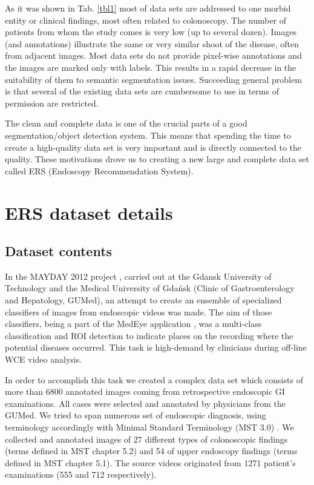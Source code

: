 \documentclass[preprint]{article}
\renewcommand{\twocolumn}{}
\begin{document}
\normalsize


\twocolumn



As it was shown in Tab. \ref{tbl1} most of data sets are addressed to one morbid entity or clinical findings, most often related to colonoscopy. The number of patients from whom the study comes is very low (up to several dozen). Images (and annotations) illustrate the same or very similar shoot of the disease, often from adjacent images. Most data sets do not provide pixel-wise annotations and the images are marked only with labels. This results in a rapid decrease in the suitability of them to semantic segmentation issues. Succeeding general problem is that several of the existing data sets are cumbersome to use in terms of permission are restricted. 

 The clean and complete data is one of the crucial parts of a good segmentation/object detection system. This means that spending the time to create a high-quality data set is very important and is directly connected to the quality. These motivations drove us to creating a new large and complete data set called ERS (Endoscopy Recommendation System).




\section{ERS dataset details}

\subsection{Dataset contents}

In the MAYDAY 2012 project \cite{Blokus2012}, carried out at the Gdansk University of Technology and the Medical University of Gdańsk (Clinic of Gastroenterology and Hepatology, GUMed), an attempt to create an ensemble of specialized classifiers of images from endoscopic videos was made. The aim of those classifiers, being a part of the MedEye application \cite{Krawczyk2012}, was a multi-class classification and ROI detection to indicate places on the recording where the potential diseases occurred. This task is high-demand by clinicians during off-line WCE video analysis.

In order to accomplish this task we created a complex data set which consists of more than 6800 annotated images coming from retrospective endoscopic GI examinations. All cases were selected and annotated by physicians from the GUMed. We tried to span numerous set of endoscopic diagnosis, using terminology accordingly with Minimal Standard Terminology (MST 3.0) \cite{MST}. We collected and annotated images of 27 different types of colonoscopic findings (terms defined in MST chapter 5.2) and 54 of upper endoscopy findings (terms defined in MST chapter 5.1). The source videos originated from 1271 patient’s examinations (555 and 712 respectively).
\end{document}
